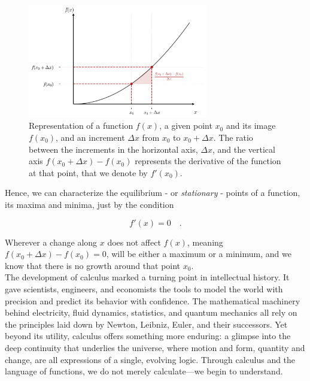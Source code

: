 \documentclass{book}
\begin{document}
\begin{figure}[ht]
    \centering
    \includegraphics[width=0.7\textwidth]{figures/appendix/functions_point_2_shadow.png}
    \caption{Representation of a function $f(x)$, a given point $x_0$ and its image $f(x_0)$, and an increment $\Delta x$ from $x_0$ to $x_0 + \Delta x$. The ratio between the increments in the horizontal axis, $\Delta x$, and the vertical axis $f(x_0 + \Delta x) - f(x_0)$ represents the derivative of the function at that point, that we denote by $f'(x_0)$.}
    \label{fig:functions_point_2_shadow}
\end{figure}

Hence, we can characterize the equilibrium - or \textit{stationary} - points of a function, its maxima and minima, just by the condition

\begin{equation}
	f'(x) = 0 \quad .
\end{equation}

Wherever a change along $x$ does not affect $f(x)$, meaning $f(x_0 + \Delta x) - f(x_0) = 0$, will be either a maximum or a minimum, and we know that there is no growth around that point $x_0$.\\

The development of calculus marked a turning point in intellectual history. It gave scientists, engineers, and economists the tools to model the world with precision and predict its behavior with confidence. The mathematical machinery behind electricity, fluid dynamics, statistics, and quantum mechanics all rely on the principles laid down by Newton, Leibniz, Euler, and their successors. Yet beyond its utility, calculus offers something more enduring: a glimpse into the deep continuity that underlies the universe, where motion and form, quantity and change, are all expressions of a single, evolving logic. Through calculus and the language of functions, we do not merely calculate---we begin to understand.\\
\end{document}
